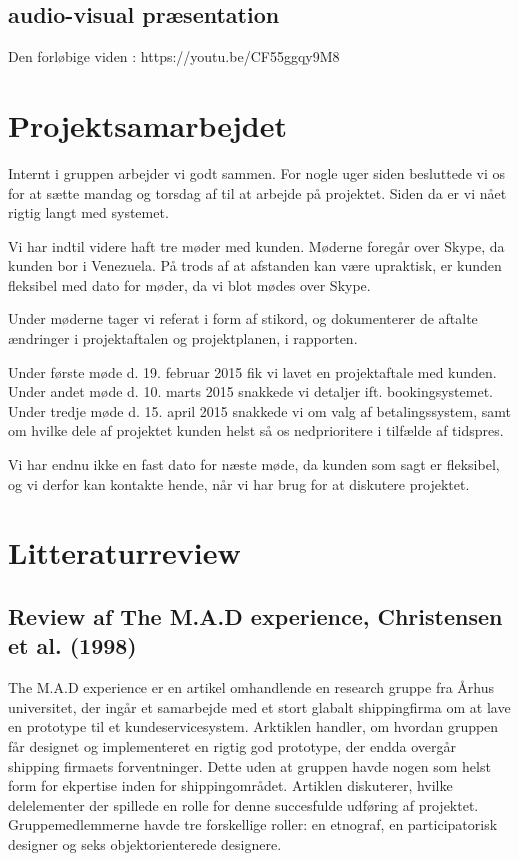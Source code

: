 \documentclass[12pt,a4paper]{article}
\begin{document}
\subsection{audio-visual præsentation}
Den forløbige viden : https://youtu.be/CF55ggqy9M8
\section{Projektsamarbejdet}
Internt i gruppen arbejder vi godt sammen. For nogle uger siden besluttede vi os for at sætte mandag og torsdag af til at arbejde på projektet. Siden da er vi nået rigtig langt med systemet. 

Vi har indtil videre haft tre møder med kunden. Møderne foregår over Skype, da kunden bor i Venezuela. På trods af at afstanden kan være upraktisk, er kunden fleksibel med dato for møder, da vi blot mødes over Skype.

Under møderne tager vi referat i form af stikord, og dokumenterer de aftalte ændringer i projektaftalen og projektplanen, i rapporten. 

Under første møde d. 19. februar 2015 fik vi lavet en projektaftale med kunden.\\
Under andet møde d. 10. marts 2015 snakkede vi detaljer ift. bookingsystemet.\\
Under tredje møde d. 15. april 2015 snakkede vi om valg af betalingssystem, samt om hvilke dele af projektet kunden helst så os nedprioritere i tilfælde af tidspres.

Vi har endnu ikke en fast dato for næste møde, da kunden som sagt er fleksibel, og vi derfor kan kontakte hende, når vi har brug for at diskutere projektet.
\newpage
\section{Litteraturreview}
\subsection{Review af The M.A.D experience, Christensen et al. (1998)}
The M.A.D experience er en artikel omhandlende en research gruppe fra Århus universitet, der  ingår et samarbejde med et stort glabalt shippingfirma om at lave en prototype til et kundeservicesystem. 
Arktiklen handler, om hvordan gruppen får designet og implementeret en rigtig god prototype, der endda overgår shipping firmaets forventninger. Dette uden at gruppen havde nogen som helst form for ekpertise inden for shippingområdet.
Artiklen diskuterer, hvilke delelementer der spillede en rolle for denne succesfulde udføring af projektet.
Gruppemedlemmerne havde tre forskellige roller: en etnograf, en participatorisk designer og seks objektorienterede designere. 
\end{document}
